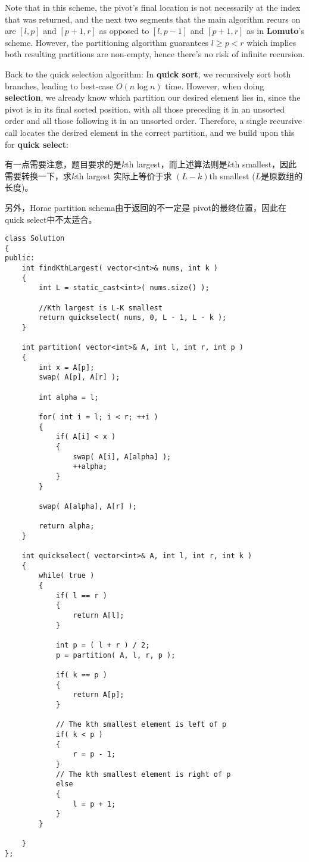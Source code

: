 Note that in this scheme, the pivot's final location is not necessarily at the index that was returned, and the next two segments that the main algorithm recurs on are $[l, p]$ and $[p+1, r]$ as opposed to $[l, p-1]$ and $[p+1, r]$ as in \textbf{Lomuto}'s scheme. However, the partitioning algorithm guarantees $l\geq p < r$ which implies both resulting partitions are non-empty, hence there's no risk of infinite recursion.

Back to the quick selection algorithm: In \textbf{quick sort}, we recursively sort both branches, leading to best-case $O(n \log n)$ time. However, when doing \textbf{selection}, we already know which partition our desired element lies in, since the pivot is in its final sorted position, with all those preceding it in an unsorted order and all those following it in an unsorted order. Therefore, a single recursive call locates the desired element in the correct partition, and we build upon this for \textbf{quick select}:


有一点需要注意，题目要求的是$k$th largest，而上述算法则是$k$th smallest，因此需要转换一下，求$k$th largest 实际上等价于求 $(L-k)$th smallest ($L$是原数组的长度)。

另外，Horae partition schema由于返回的不一定是 pivot的最终位置，因此在quick select中不太适合。

\setcounter{lstlisting}{0}
\begin{lstlisting}[style=customc, caption={Quick Select}]
class Solution
{
public:
    int findKthLargest( vector<int>& nums, int k )
    {
        int L = static_cast<int>( nums.size() );

		//Kth largest is L-K smallest
        return quickselect( nums, 0, L - 1, L - k );
    }

    int partition( vector<int>& A, int l, int r, int p )
    {
        int x = A[p];
        swap( A[p], A[r] );

        int alpha = l;

        for( int i = l; i < r; ++i )
        {
            if( A[i] < x )
            {
                swap( A[i], A[alpha] );
                ++alpha;
            }
        }

        swap( A[alpha], A[r] );

        return alpha;
    }

    int quickselect( vector<int>& A, int l, int r, int k )
    {
        while( true )
        {
            if( l == r )
            {
                return A[l];
            }

            int p = ( l + r ) / 2;
            p = partition( A, l, r, p );

            if( k == p )
            {
                return A[p];
            }

			// The kth smallest element is left of p
            if( k < p )
            {
                r = p - 1;
            }
            // The kth smallest element is right of p
            else
            {
                l = p + 1;
            }
        }

    }
};
\end{lstlisting}

 
